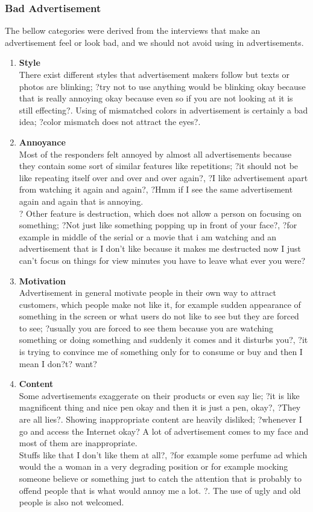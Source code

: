 \subsubsection{Bad Advertisement}
The bellow categories were derived from the interviews that make an advertisement feel or look bad, and we should not avoid using in advertisements.

\begin{enumerate}
\item \textbf{Style} \\
There exist different styles that advertisement makers follow but texts or photos are blinking; ?try not to use anything would be blinking okay because that is really annoying okay because even so if you are not looking at it is still effecting?. Using of mismatched colors in advertisement is certainly a bad idea; ?color mismatch does not attract the eyes?.

\item \textbf{Annoyance} \\
Most of the responders felt annoyed by almost all advertisements because they contain some sort of similar features like repetitions; ?it should not be like repeating itself over and over and over again?, ?I like advertisement apart from watching it again and again?, ?Hmm if I see the same advertisement again and again that is annoying. \\
? Other feature is destruction, which does not allow a person on focusing on something; ?Not just like something popping up in front of your face?, ?for example in middle of the serial or a movie that i am watching and an advertisement that is I don't like because it makes me destructed now I just can't focus on things for view minutes you have to leave what ever you were?

\item \textbf{Motivation} \\
Advertisement in general motivate people in their own way to attract customers, which people make not like it, for example sudden appearance of something in the screen or what users do not like to see but they are forced to see; ?usually you are forced to see them because you are watching something or doing something and suddenly it comes and it disturbs you?, ?it is trying to convince me of something only for to consume or buy and then I mean I don?t? want?

\item \textbf{Content} \\
Some advertisements exaggerate on their products or even say lie; ?it is like magnificent thing and nice pen okay and then it is just a pen, okay?, ?They are all lies?. Showing inappropriate content are heavily disliked; ?whenever I go and access the Internet okay? A lot of advertisement comes to my face and most of them are inappropriate. \\
Stuffs like that I don't like them at all?, ?for example some perfume ad which would the a woman in a very degrading position or for example mocking someone believe or something just to catch the attention that is probably to offend people that is what would annoy me a lot. ?. The use of ugly and old people is also not welcomed.


\end{enumerate}
